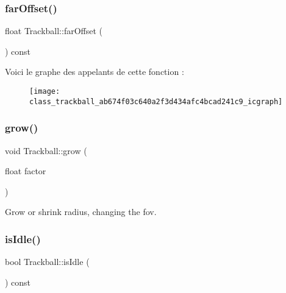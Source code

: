 \mbox{\label{class_trackball_ab674f03c640a2f3d434afc4bcad241c9}} 
\subsubsection{\texorpdfstring{far\+Offset()}{farOffset()}}
{\footnotesize\ttfamily float Trackball\+::far\+Offset (\begin{DoxyParamCaption}{ }\end{DoxyParamCaption}) const}

Voici le graphe des appelants de cette fonction \+:\nopagebreak
\begin{figure}[H]
\begin{center}
\leavevmode
\texttt{[image: class\_trackball\_ab674f03c640a2f3d434afc4bcad241c9\_icgraph]}
\end{center}
\end{figure}
\mbox{\label{class_trackball_a4ac38af7646e5998ac341051d0458c58}} 
\subsubsection{\texorpdfstring{grow()}{grow()}}
{\footnotesize\ttfamily void Trackball\+::grow (\begin{DoxyParamCaption}\item[{float}]{factor }\end{DoxyParamCaption})}



Grow or shrink radius, changing the fov. 

\mbox{\label{class_trackball_a29102c33e22690b2ad3990c516800220}} 
\subsubsection{\texorpdfstring{is\+Idle()}{isIdle()}}
{\footnotesize\ttfamily bool Trackball\+::is\+Idle (\begin{DoxyParamCaption}{ }\end{DoxyParamCaption}) const}

\mbox{\label{class_trackball_a3712c12a5a5468301593a01b0df4c6be}} 
